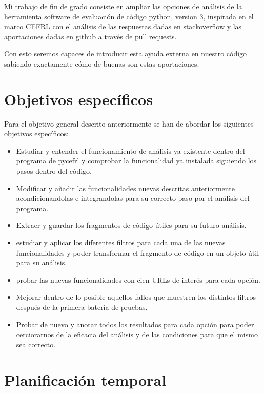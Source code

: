 \documentclass[a4paper, 12pt]{book}
\begin{document}
Mi trabajo de fin de grado consiste en ampliar las opciones de análisis de la herramienta software de evaluación de código python, version 3, inspirada en el marco CEFRL con el análisis de las respuestas dadas en stackoverflow y las aportaciones dadas en github a través de pull requests. 

Con esto seremos capaces de introducir esta ayuda externa en nuestro código sabiendo exactamente cómo de buenas son estas aportaciones.


\section{Objetivos específicos}
\label{sec:objetivos-especificos}

Para el objetivo general descrito anteriormente se han de abordar los siguientes objetivos específicos:

\begin{itemize}
	\item Estudiar y entender el funcionamiento de análisis ya existente dentro del programa de pycefrl y comprobar la funcionalidad ya instalada siguiendo los pasos dentro del código.
	\item Modificar y añadir las funcionalidades nuevas descritas anteriormente acondicionandolas e integrandolas para su correcto paso por el análisis del programa.
	\item Extraer y guardar los fragmentos de código útiles para su futuro análisis.
	\item estudiar y aplicar los diferentes filtros para cada una de las nuevas funcionalidades y poder transformar el fragmento de código en un objeto útil para su análisis.
	\item probar las nuevas funcionalidades con cien URLs de interés para cada opción.
	\item Mejorar dentro de lo posible aquellos fallos que muestren los distintos filtros después de la primera batería de pruebas.
	\item Probar de nuevo y anotar todos los resultados para cada opción para poder cerciorarnos de la eficacia del análisis y de las condiciones para que el mismo sea correcto. 
\end{itemize}


\section{Planificación temporal}
\label{sec:planificacion-temporal}
\end{document}
